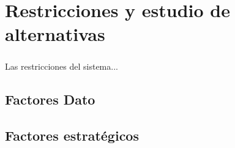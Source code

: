 \chapter{Restricciones y estudio de alternativas}
\label{ch:restricciones}
\paragraph*{}Las restricciones del sistema...

\section{Factores Dato}
\section{Factores estratégicos}
